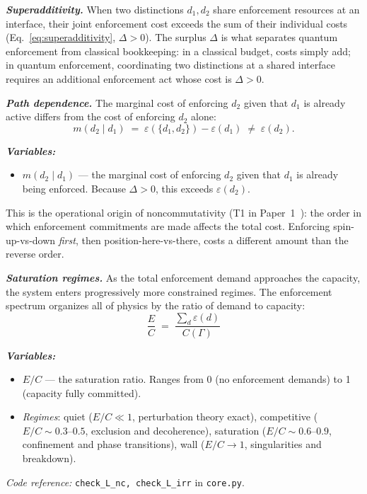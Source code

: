 \documentclass[11pt]{article}
\newenvironment{varlist}{\begin{itemize}[nosep,leftmargin=2em]}{\end{itemize}}
\newcommand{\coderef}[2]{\smallskip\noindent\textit{Code reference:} \texttt{#1} in \texttt{#2}.}
\begin{document}
\begin{tcolorbox}[apfbox, title={Consequences of $L_{\mathrm{nc}}^{\mathrm{interf}}$: Superadditivity, Path Dependence, Saturation}]

\textbf{\textit{Superadditivity.}}  When two distinctions $d_1, d_2$ share enforcement resources at an interface, their joint enforcement cost exceeds the sum of their individual costs (Eq.~\ref{eq:superadditivity}, $\Delta > 0$).  The surplus $\Delta$ is what separates quantum enforcement from classical bookkeeping: in a classical budget, costs simply add; in quantum enforcement, coordinating two distinctions at a shared interface requires an additional enforcement act whose cost is $\Delta > 0$.

\medskip
\textbf{\textit{Path dependence.}}  The marginal cost of enforcing $d_2$ given that $d_1$ is already active differs from the cost of enforcing $d_2$ alone:
\begin{equation}
m(d_2 \mid d_1) \;=\; \varepsilon(\{d_1, d_2\}) - \varepsilon(d_1) \;\ne\; \varepsilon(d_2).
\label{eq:path_dependence}
\end{equation}

\smallskip\noindent\textbf{\textit{Variables:}}
\begin{varlist}
\item $m(d_2 \mid d_1)$ --- the marginal cost of enforcing $d_2$ given that $d_1$ is already being enforced.  Because $\Delta > 0$, this exceeds $\varepsilon(d_2)$.
\end{varlist}

This is the operational origin of noncommutativity (T1 in Paper~1~\cite{BrookePaper1}): the order in which enforcement commitments are made affects the total cost.  Enforcing spin-up-vs-down \emph{first}, then position-here-vs-there, costs a different amount than the reverse order.

\medskip
\textbf{\textit{Saturation regimes.}}  As the total enforcement demand approaches the capacity, the system enters progressively more constrained regimes.  The enforcement spectrum organizes all of physics by the ratio of demand to capacity:
\begin{equation}
\frac{E}{C} \;=\; \frac{\sum_d \varepsilon(d)}{C(\Gamma)}
\label{eq:saturation_ratio}
\end{equation}

\smallskip\noindent\textbf{\textit{Variables:}}
\begin{varlist}
\item $E/C$ --- the saturation ratio.  Ranges from 0 (no enforcement demands) to 1 (capacity fully committed).
\item \textit{Regimes}: quiet ($E/C \ll 1$, perturbation theory exact), competitive ($E/C \sim 0.3$--$0.5$, exclusion and decoherence), saturation ($E/C \sim 0.6$--$0.9$, confinement and phase transitions), wall ($E/C \to 1$, singularities and breakdown).
\end{varlist}

\coderef{check\_L\_nc, check\_L\_irr}{core.py}
\end{tcolorbox}
\end{document}
